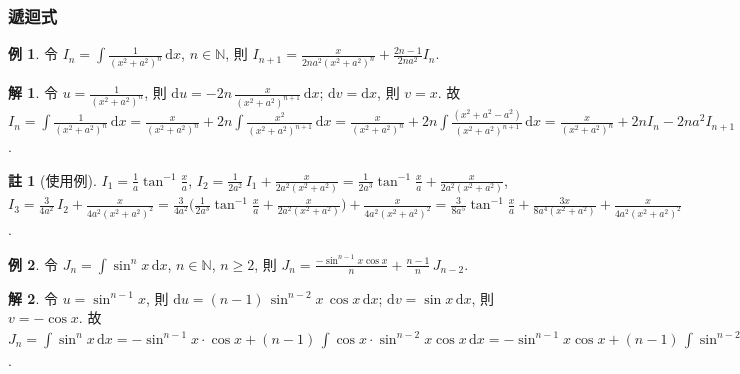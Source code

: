 \documentclass[12pt]{extarticle}
\newcommand{\ds}{\displaystyle}
\newcommand{\ie}{\;\Longrightarrow\;}
\theoremstyle{definition}
\newtheorem*{ex}{例}
\newtheorem*{sol}{解}
\newtheorem*{rmk}{註}
\newcommand{\myline}{\noindent\makebox[\linewidth]{\rule{\paperwidth}{0.4pt}}}
\begin{document}
\myline

\subsubsection*{遞迴式}
\begin{ex} 
  令 $\ds I_n = \int\!\frac{1}{(x^2 + a^2)^n}\,\text{d}x$, $n\in\mathbb{N}$, 則 $\ds I_{n + 1} = \frac{x}{2na^2(x^2 + a^2)^n} + \frac{2n - 1}{2na^2}I_n$.
\end{ex}

\begin{sol}
  令 $\ds u = \frac{1}{(x^2 + a^2)^n}$, 則 $\ds\text{d}u = -2n\,\frac{x}{(x^2 + a^2)^{n + 1}}\,\text{d}x$; $\ds\text{d}v = \text{d}x$, 則 $\ds v = x$. 故 $\ds I_n = \int\!\frac{1}{(x^2 + a^2)^n}\,\text{d}x = \frac{x}{(x^2 + a^2)^n} + 2n\int\!\frac{x^2}{(x^2 + a^2)^{n + 1}}\,\text{d}x = \frac{x}{(x^2 + a^2)^n} + 2n\int\frac{(x^2 + a^2 - a^2)}{(x^2 + a^2)^{n + 1}}\,\text{d}x = \frac{x}{(x^2 + a^2)^n} + 2n I_n - 2na^2 I_{n + 1}\ie 2na^2 I_{n + 1} = \frac{x}{(x^2 + a^2)^n} + (2n - 1)I_n\ie I_{n + 1} = \frac{x}{2na^2(x^2 + a^2)^n} + \frac{2n - 1}{2na^2}I_n$.  
\end{sol}

\begin{rmk}[使用例]
  $\ds I_1 = \frac{1}{a}\tan^{-1}\frac{x}{a}$, $\ds I_2 = \frac{1}{2a^2}\,I_1 + \frac{x}{2a^2(x^2+a^2)} = \frac{1}{2a^3}\tan^{-1}\frac{x}{a} + \frac{x}{2a^2(x^2+a^2)}$, $\ds I_3 = \frac{3}{4a^2}\,I_2 + \frac{x}{4a^2(x^2+a^2)^2} = \frac{3}{4a^2}\bigg(\frac{1}{2a^3}\tan^{-1}\frac{x}{a} + \frac{x}{2a^2(x^2+a^2)}\bigg) + \frac{x}{4a^2(x^2+a^2)^2} = \frac{3}{8a^5}\tan^{-1}\frac{x}{a} + \frac{3x}{8a^4(x^2+a^2)} + \frac{x}{4a^2(x^2+a^2)^2}$.
\end{rmk}

\begin{ex} 
  令 $\ds J_n = \int\!\sin^n\!x\,\text{d}x$, $n\in\mathbb{N}$, $n\geqslant 2$, 則 $\ds J_n = \frac{-\sin^{n - 1}\!x\cos x}{n} + \frac{n - 1}{n}\,J_{n - 2}$. 
\end{ex}

\begin{sol}
  令 $\ds u = \sin^{n-1}\!x$, 則 $\ds\text{d}u = (n - 1)\,\sin^{n - 2}\!x\,\cos x\,\text{d}x$; $\ds\text{d}v = \sin x\,\text{d}x$, 則 $\ds v = -\cos x$. 故 $\ds J_n = \int\!\sin^n\!x\,\text{d}x = -\sin^{n - 1}\!x\cdot\cos x + (n - 1)\,\int\!\cos x\cdot\sin^{n - 2}\!x\cos x\,\text{d}x = -\sin^{n - 1}\!x\cos x + (n - 1)\,\int\!\sin^{n - 2}\!x\cos^2\!x\,\text{d}x = -\sin^{n - 1}\!x\cos x + (n - 1)\,\int\!\sin^{n - 2}\!x\cdot(1 - \sin^2\!x)\,\text{d}x = -\sin^{n - 1}\!x\cos x + (n - 1)\,\int\!\sin^{n - 2}\!x\,\text{d}x - (n - 1)\,\int\!\sin^n\!x\,\text{d}x = -\sin^{n - 1}\!x\cos x + (n - 1) J_{n - 2} + (1 - n)J_n\ie n J_n = -\sin^{n - 1}\!x\cos x + (n - 1) J_{n - 2} \ie J_n = \frac{-\sin^{n - 1}\!x\cos x}{n} + \frac{n - 1}{n}\,J_{n - 2}$.  
\end{sol}
\end{document}
